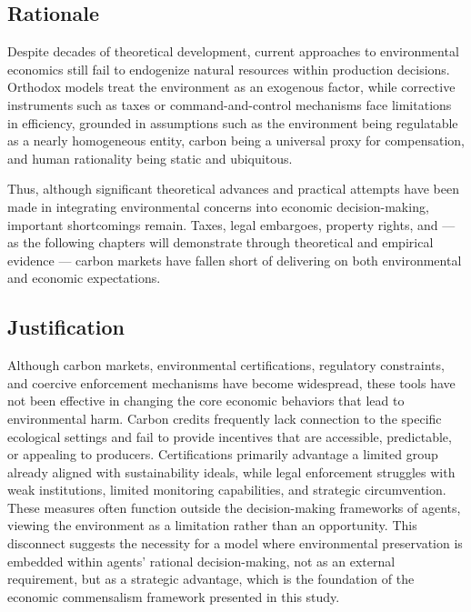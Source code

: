 \subsection{Rationale}

Despite decades of theoretical development, current approaches to environmental economics still fail to endogenize natural resources within production decisions. Orthodox models treat the environment as an exogenous factor, while corrective instruments such as taxes or command-and-control mechanisms face limitations in efficiency, grounded in assumptions such as the environment being regulatable as a nearly homogeneous entity, carbon being a universal proxy for compensation, and human rationality being static and ubiquitous. 

Thus, although significant theoretical advances and practical attempts have been made in integrating environmental concerns into economic decision-making, important shortcomings remain. Taxes, legal embargoes, property rights, and — as the following chapters will demonstrate through theoretical and empirical evidence — carbon markets have fallen short of delivering on both environmental and economic expectations. 

\subsection{Justification}

Although carbon markets, environmental certifications, regulatory constraints, and coercive enforcement mechanisms have become widespread, these tools have not been effective in changing the core economic behaviors that lead to environmental harm. Carbon credits frequently lack connection to the specific ecological settings and fail to provide incentives that are accessible, predictable, or appealing to producers. Certifications primarily advantage a limited group already aligned with sustainability ideals, while legal enforcement struggles with weak institutions, limited monitoring capabilities, and strategic circumvention. These measures often function outside the decision-making frameworks of agents, viewing the environment as a limitation rather than an opportunity. This disconnect suggests the necessity for a model where environmental preservation is embedded within agents’ rational decision-making, not as an external requirement, but as a strategic advantage, which is the foundation of the economic commensalism framework presented in this study.

